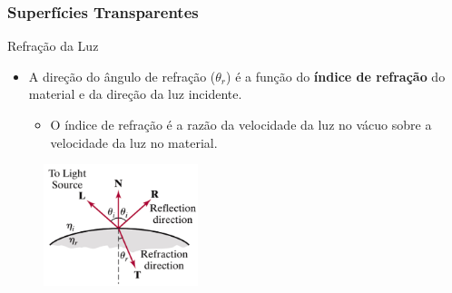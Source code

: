 \documentclass{beamer}
\begin{document}
\begin{frame}
\frametitle{Superfícies Transparentes}

	\begin{block}{Refração da Luz}
		\begin{itemize}
			\item A direção do ângulo de refração ($\theta_r$) é a função do \textbf{índice de refração} do material e da direção da luz incidente.
			\begin{itemize}
				\item O índice de refração é a razão da velocidade da luz no vácuo sobre a velocidade da luz no material.
			\end{itemize}
		\end{itemize}
	\end{block}
	
	\begin{figure}[!h]
		\begin{center}
		\includegraphics[width=0.4\textwidth]{Figures/LigRef}
		\end{center}
	\end{figure}	
\end{frame}
\end{document}
